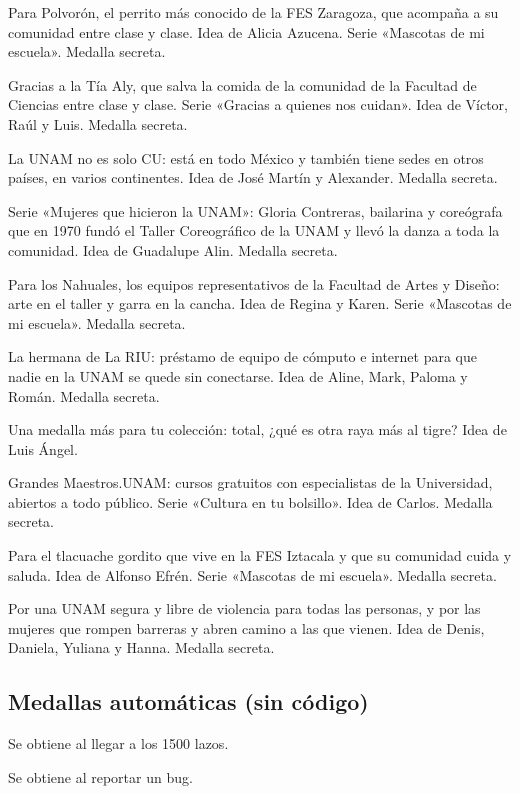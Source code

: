 \begin{description}[leftmargin=1.4cm, style=nextline]
  \item[P0LV0R0N] Para Polvorón, el perrito más conocido de la FES Zaragoza, que acompaña a su comunidad entre clase y clase. Idea de Alicia Azucena. Serie «Mascotas de mi escuela». Medalla secreta.
  \item[T14AL1] Gracias a la Tía Aly, que salva la comida de la comunidad de la Facultad de Ciencias entre clase y clase. Serie «Gracias a quienes nos cuidan». Idea de Víctor, Raúl y Luis. Medalla secreta.
  \item[UNAMMUND0] La UNAM no es solo CU: está en todo México y también tiene sedes en otros países, en varios continentes. Idea de José Martín y Alexander. Medalla secreta.
  \item[GL0R14C] Serie «Mujeres que hicieron la UNAM»: Gloria Contreras, bailarina y coreógrafa que en 1970 fundó el Taller Coreográfico de la UNAM y llevó la danza a toda la comunidad. Idea de Guadalupe Alin. Medalla secreta.
  \item[N4HU4L3S] Para los Nahuales, los equipos representativos de la Facultad de Artes y Diseño: arte en el taller y garra en la cancha. Idea de Regina y Karen. Serie «Mascotas de mi escuela». Medalla secreta.
  \item[PCPUM4S] La hermana de La RIU: préstamo de equipo de cómputo e internet para que nadie en la UNAM se quede sin conectarse. Idea de Aline, Mark, Paloma y Román. Medalla secreta.
  \item[R4Y4T1GR3] Una medalla más para tu colección: total, ¿qué es otra raya más al tigre? Idea de Luis Ángel.
  \item[M43STR0S] Grandes Maestros.UNAM: cursos gratuitos con especialistas de la Universidad, abiertos a todo público. Serie «Cultura en tu bolsillo». Idea de Carlos. Medalla secreta.
  \item[1ZT4CU4CH3] Para el tlacuache gordito que vive en la FES Iztacala y que su comunidad cuida y saluda. Idea de Alfonso Efrén. Serie «Mascotas de mi escuela». Medalla secreta.
  \item[S3GUR4S] Por una UNAM segura y libre de violencia para todas las personas, y por las mujeres que rompen barreras y abren camino a las que vienen. Idea de Denis, Daniela, Yuliana y Hanna. Medalla secreta.
\end{description}

\subsection*{Medallas automáticas (sin código)}
\begin{description}[leftmargin=3.6cm, style=nextline]
  \item[Persona Famosa] Se obtiene al llegar a los 1500 lazos.
  \item[Bug Killer] Se obtiene al reportar un bug.
\end{description}

